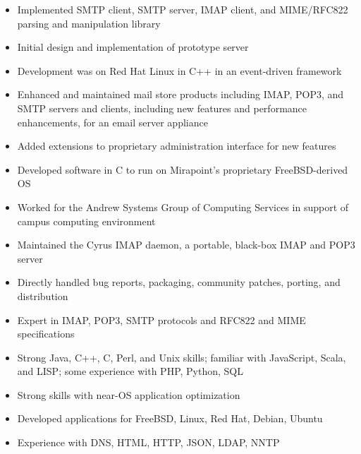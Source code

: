 \documentclass[letterpaper,12pt,twoside]{article}
\begin{document}
\vspace{-11pt}
\begin{itemize}
\item Implemented SMTP client, SMTP server, IMAP client, and
  MIME/RFC822 parsing and manipulation library
\item Initial design and implementation of prototype server
\item Development was on Red Hat Linux in C++ in an event-driven framework
\end{itemize}

\pagebreak

\vspace{-11pt}
\begin{itemize}
\item Enhanced and maintained mail store products including
  IMAP, POP3, and SMTP servers and clients, including new features
  and performance enhancements, for an email server appliance
\item Added extensions to proprietary administration interface for new
  features
\item Developed software in C to run on Mirapoint’s proprietary
  FreeBSD-derived OS
\end{itemize}

\vspace{-11pt}
\begin{itemize}
\item Worked for the Andrew Systems Group of Computing Services in
  support of campus computing environment
\item Maintained the Cyrus IMAP daemon, a portable, black-box IMAP and
  POP3 server
\item Directly handled bug reports, packaging, community patches,
  porting, and distribution
\end{itemize}


\vspace{-6pt}
\begin{itemize}
\item Expert in IMAP, POP3, SMTP protocols and RFC822 and MIME specifications
\item Strong Java, C++, C, Perl, and Unix skills; familiar with JavaScript,
  Scala, and LISP; some experience with PHP, Python, SQL
\item Strong skills with near-OS application optimization
\item Developed applications for FreeBSD, Linux, Red Hat, Debian, Ubuntu
\item Experience with DNS, HTML, HTTP, JSON, LDAP, NNTP
\end{itemize}
\end{document}
